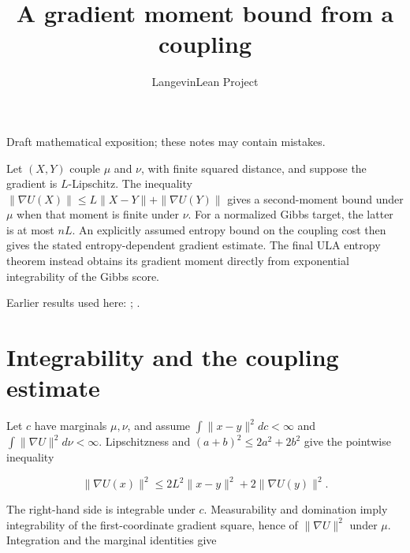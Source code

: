 \documentclass[11pt,a4paper]{article}
\title{\texorpdfstring{A gradient moment bound from a coupling}{A gradient moment bound from a coupling}}
\author{LangevinLean Project}
\date{}
\begin{document}
\maketitle
Draft mathematical exposition; these notes may contain mistakes.


Let \((X,Y)\) couple \(\mu\) and \(\nu\), with finite squared distance, and suppose the gradient is \(L\)-Lipschitz. The inequality \(\|\nabla U(X)\|\le L\|X-Y\|+\|\nabla U(Y)\|\) gives a second-moment bound under \(\mu\) when that moment is finite under \(\nu\). For a normalized Gibbs target, the latter is at most \(nL\). An explicitly assumed entropy bound on the coupling cost then gives the stated entropy-dependent gradient estimate. The final ULA entropy theorem instead obtains its gradient moment directly from exponential integrability of the Gibbs score.



Earlier results used here: \cite[Section~3.17]{LangevinLean2026ULASC}; \cite[Section~3.27]{LangevinLean2026ULASC}.

\section{\texorpdfstring{Integrability and the coupling estimate}{Integrability and the coupling estimate}}


Let \(c\) have marginals \(\mu,\nu\), and assume \(\int\|x-y\|^2dc<\infty\) and \(\int\|\nabla U\|^2d\nu<\infty\). Lipschitzness and \((a+b)^2\le2a^2+2b^2\) give the pointwise inequality

\[\|\nabla U(x)\|^2\le2L^2\|x-y\|^2+2\|\nabla U(y)\|^2.\]

The right-hand side is integrable under \(c\). Measurability and domination imply integrability of the first-coordinate gradient square, hence of \(\|\nabla U\|^2\) under \(\mu\). Integration and the marginal identities give
\end{document}
